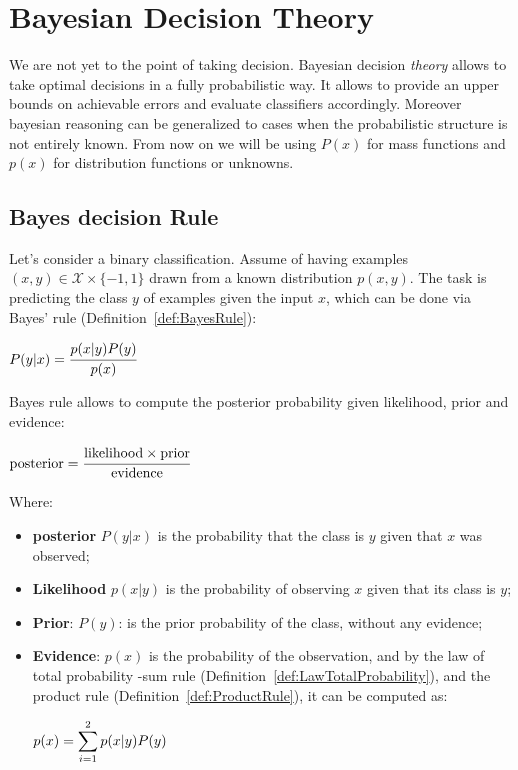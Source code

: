 \chapter{Bayesian Decision Theory}
We are not yet to the point of taking decision. Bayesian decision \textit{theory} allows to take optimal decisions in a fully probabilistic way. \newline
It allows to provide an upper bounds on achievable errors and evaluate classifiers accordingly. Moreover bayesian reasoning can be generalized to cases when the probabilistic structure is not entirely known. \newline
From now on we will be using $P(x)$ for mass functions and $p(x)$ for distribution functions or unknowns.\newline
%
%
\section{Bayes decision Rule}
Let's consider a binary classification. Assume of having examples $(x,y)\in\mathcal{X}\times\{-1,1\}$ drawn from a known distribution $p(x,y)$. The task is predicting the class $y$ of examples given the input $x$, which can be done via Bayes' rule (Definition~\ref{def:BayesRule}):
\begin{center}
	$\displaystyle P(y\vert x)=\cfrac{p(x\vert y)P(y)}{p(x)}$
\end{center}
Bayes rule allows to compute the posterior probability given likelihood, prior and evidence:
\begin{center}
	$\displaystyle \text{posterior}=\cfrac{\text{likelihood}\times\text{prior}}{\text{evidence}}$
\end{center}
Where:
\begin{itemize}
	\item \textbf{posterior} $P(y\vert x)$ is the probability that the class is $y$ given that $x$ was observed;
	\item \textbf{Likelihood} $p(x\vert y)$ is the probability of observing $x$ given that its class is $y$;
	\item \textbf{Prior}: $P(y)$: is the prior probability of the class, without any evidence;
	\item \textbf{Evidence}: $p(x)$ is the probability of the observation, and by the law of total probability -sum rule (Definition~\ref{def:LawTotalProbability}), and the product rule (Definition~\ref{def:ProductRule}), it can be computed as:
\begin{center}
	$\displaystyle p(x)=\displaystyle\sum_{i=1}^2p(x\vert y)P(y)$
\end{center}
\end{itemize}
